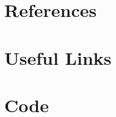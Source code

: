 \documentclass[review,3p,authoryear]{elsarticle}
\begin{document}
\section{References}

\appendix\clearpage
\section{Useful Links}\label{ap:links}

\section{Code}\label{ap:code}

\end{document}
